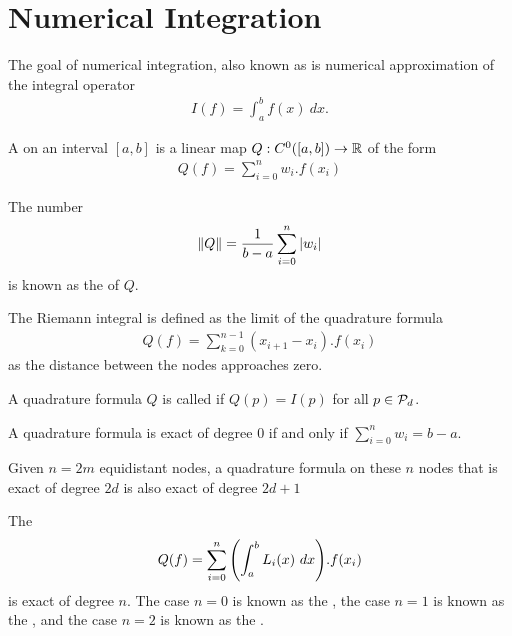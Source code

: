 \section{Numerical Integration}
The goal of numerical integration, also known as  is numerical approximation of the integral operator
\begin{align*}
	I(f) = \int_a^b f(x) ~dx.
\end{align*}
\begin{definition}
	A  on an interval $[a,b]$ is a linear map $Q : C^0([a,b]) \to \mathbb{R}$ of the form
	\begin{align*}
		Q(f) = \sum_{i = 0}^n w_i.f(x_i)
	\end{align*}
\end{definition}
\begin{definition}
	The number $$\norm{Q} = \frac{1}{b-a} \sum_{i = 0}^n \abs{w_i}$$ is known as the  of $Q$.
\end{definition}
The Riemann integral is defined as the limit of the quadrature formula
\begin{align*}
	Q(f) = \sum_{k = 0}^{n-1} (x_{i+1} - x_i).f(x_i)
\end{align*}
as the distance between the nodes approaches zero.
\begin{definition}
	A quadrature formula $Q$ is called  if $Q(p) = I(p)$ for all $p \in \mathcal{P}_d$.
\end{definition}
\begin{exercise}
	A quadrature formula is exact of degree $0$ if and only if $\sum_{i = 0}^n w_i = b-a$.
\end{exercise}
\begin{lemma}
	Given $n = 2m$ equidistant nodes, a quadrature formula on these $n$ nodes that is exact of degree $2d$ is also exact of degree $2d+1$
\end{lemma}
\begin{importanttheorem}{}{}
	The 
	\begin{align*}
		Q(f) = \sum_{i = 0}^n \qty(\int_a^b L_i(x) ~dx).f(x_i)
	\end{align*}
	is exact of degree $n$. The case $n = 0$ is known as the , the case $n = 1$ is known as the , and the case $n = 2$ is known as the .
\end{importanttheorem}
